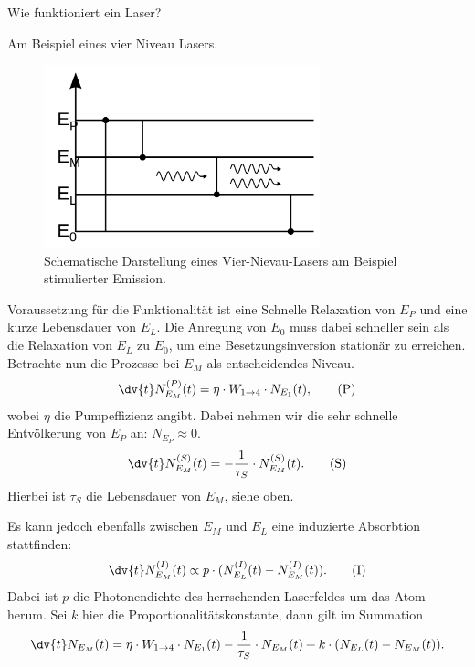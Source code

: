 \documentclass{subfiles}
\begin{document}
    \begin{Frage}
        Wie funktioniert ein Laser?
    \end{Frage}
    \begin{Antwort}
        Am Beispiel eines vier Niveau Lasers. 
        \begin{figure}[H]
            \centering
            \includegraphics[width=8cm]{Bilddateien/Lasing.svg.png}
            \caption{Schematische Darstellung eines Vier-Nievau-Lasers am Beispiel stimulierter Emission.}
            \label{fig:Lasing}
        \end{figure}
        Voraussetzung für die Funktionalität ist eine Schnelle Relaxation von $E_P$ und eine kurze Lebensdauer von $E_L$. Die Anregung von $E_0$ muss dabei schneller sein als die Relaxation von $E_L$ zu $E_0$, um eine Besetzungsinversion stationär zu erreichen. Betrachte nun die Prozesse bei $E_M$ als entscheidendes Niveau. 
        \begin{align*}
            \dv{t}N_{E_M}^{(P)}(t) = \eta\cdot W_{1\to 4}\cdot N_{E_1}(t), \tag{P}
        \end{align*}
        wobei $\eta$ die Pumpeffizienz angibt. Dabei nehmen wir die sehr schnelle Entvölkerung von $E_P$ an: $N_{E_P} \approx 0$. 
        \[
            \dv{t}N_{E_M}^{(S)}(t) = -\frac{1}{\tau_S}\cdot N_{E_M}^{(S)}(t). \tag{S}
        \]
        Hierbei ist $\tau_S$ die Lebensdauer von $E_M$, siehe oben. 

        Es kann jedoch ebenfalls zwischen $E_M$ und $E_L$ eine induzierte Absorbtion stattfinden:
        \[
            \dv{t}N_{E_M}^{(I)}(t) \propto p\cdot (N_{E_L}^{(I)}(t) - N_{E_M}^{(I)}(t)). \tag{I}
        \]
        Dabei ist $p$ die Photonendichte des herrschenden Laserfeldes um das Atom herum. Sei $k$ hier die Proportionalitätskonstante, dann gilt im Summation
        \[
            \dv{t}N_{E_M}(t) = \eta\cdot W_{1\to 4}\cdot N_{E_1}(t) - \frac{1}{\tau_S}\cdot N_{E_M}(t) + k\cdot (N_{E_L}(t) - N_{E_M}(t)).
        \]


\end{Antwort}
\end{document}
